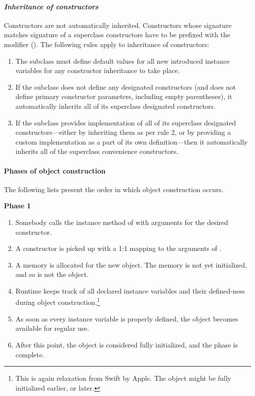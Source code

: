 \paragraph{\em Inheritance of constructors}
Constructors are not automatically inherited. Constructors whose signature matches signature of a superclass constructors have to be prefixed with the  modifier (). The following rules apply to inheritance of constructors:
\begin{enumerate}
  \item[Rule 1] The subclass must define default values for all new introduced instance variables for any constructor inheritance to take place. 
  \item[Rule 2] If the subclass does not define any designated constructors (and does not define primary constructor parameters, including empty parentheses), it automatically inherits all of its superclass designated constructors. 
  \item[Rule 3] If the subclass provides implementation of all of its superclass designated constructors---either by inheriting them as per rule 2, or by providing a custom implementation as a part of its own definition---then it automatically inherits all of the superclass convenience constructors. 
\end{enumerate}

\paragraph{Phases of object construction}
The following lists present the order in which object construction occurs.

{\bfseries Phase 1}
\begin{enumerate}
  \item Somebody calls the  instance method of  with arguments for the desired constructor. 
  \item A constructor is picked up with a 1:1 mapping to the arguments of . 
  \item A memory is allocated for the new object. The memory is not yet initialized, and so is not the object. 
  \item Runtime keeps track of all declared instance variables and their defined-ness during object construction.\footnote{This is again relaxation from Swift by Apple. The object might be fully initialized earlier, or later.} 
  \item As soon as every instance variable is properly defined, the  object becomes available for regular use. 
  \item After this point, the object is considered fully initialized, and the phase is complete. 
\end{enumerate}


